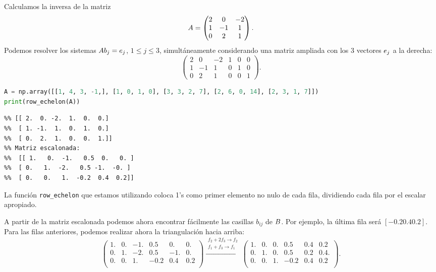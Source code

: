 \begin{ejemplo}
Calculamos la inversa de la matriz
$$
\Ab = \begin{pmatrix} 2 & 0 & -2 \\ 1 & -1 & 1 \\ 0 & 2 & 1\end{pmatrix}.
$$
Podemos resolver los sistemas $\Ab \bb_j = \eb_j$, $1 \le j \le 3$, simultáneamente considerando una matriz ampliada con los 3 vectores $\eb_j$ a la derecha:
$$
\left(\begin{array}{ccc|ccc} 2 & 0 & -2 & 1 & 0 & 0 \\ 1 & -1 & 1 & 0 & 1 & 0\\ 0 & 2 & 1 & 0 & 0 & 1\end{array}\right).
$$

\begin{Shaded}
\begin{lstlisting}[language=Python]
A = np.array([[1, 4, 3, -1,], [1, 0, 1, 0], [3, 3, 2, 7], [2, 6, 0, 14], [2, 3, 1, 7]])
print(row_echelon(A))
\end{lstlisting}
\end{Shaded}

\begin{verbatim}
%% [[ 2.  0. -2.  1.  0.  0.]
%%  [ 1. -1.  1.  0.  1.  0.]
%%  [ 0.  2.  1.  0.  0.  1.]]
%% Matriz escalonada:
%%  [[ 1.   0.  -1.   0.5  0.   0. ]
%%  [ 0.   1.  -2.   0.5 -1.  -0. ]
%%  [ 0.   0.   1.  -0.2  0.4  0.2]]
\end{verbatim}

La función \texttt{row\_echelon} que estamos utilizando coloca 1's como primer elemento no nulo de cada fila, dividiendo cada fila por el escalar apropiado.

A partir de la matriz escalonada podemos ahora encontrar fácilmente las casillas $b_{ij}$ de $\Bb$. Por ejemplo, la última fila será $[-0.2 0.4 0.2]$. Para las filas anteriores, podemos realizar ahora la triangulación hacia arriba:
$$
\left(\begin{array}{ccc|ccc}
 1. &  0. & -1. &  0.5 &  0.  &  0.  \\
 0. &  1. & -2. &  0.5 & -1.  & 0.  \\
 0. &  0. &  1. & -0.2 &  0.4 &  0.2 \\
\end{array}\right)
\xrightarrow{\substack{f_2 + 2f_3 \rightarrow f_2 \\ f_1 + f_3 \rightarrow f_1}}
\left(\begin{array}{ccc|ccc}
 1. &  0. & 0. &  0.5 &  0.4  &  0.2  \\
 0. &  1. & 0. &  0.5 & 0.2  & 0.4.  \\
 0. &  0. &  1. & -0.2 &  0.4 &  0.2 \\
 \end{array}\right).
$$


\end{ejemplo}
